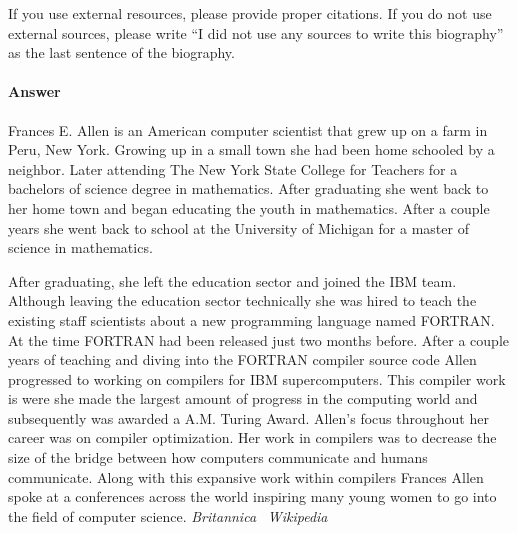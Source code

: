 \documentclass{article}
\begin{document}
If you use external resources, please provide
proper citations. If you do not use external sources, please write ``I did not
use any sources to write this biography'' as the last sentence of the
biography.

\paragraph{Answer}
Frances E. Allen is an American computer scientist that grew up on a farm in Peru,
New York. Growing up in a small town she had been home schooled by a neighbor.
Later attending The New York State College for Teachers for a bachelors of science
degree in mathematics. After graduating she went back to her home town and began
educating the youth in mathematics. After a couple years she went back to school
at the University of Michigan for a master of science in mathematics.

After graduating, she left the education sector and joined the IBM team. Although
leaving the education sector technically she was hired to teach the existing
staff scientists about a new programming language named FORTRAN. At the time FORTRAN
had been released just two months before. After a couple years of teaching and
diving into the FORTRAN compiler source code Allen progressed to working on
compilers for IBM supercomputers. This compiler work is were she made the
largest amount of progress in the computing world and subsequently was awarded
a A.M. Turing Award. Allen's focus throughout her career was on compiler optimization.
Her work in compilers was to decrease the size of the bridge between how computers
communicate and humans communicate. Along with this expansive work within compilers
Frances Allen spoke at a conferences across the world inspiring many young women
to go into the field of computer science.
\emph{Britannica}~\cite{britannica}
\emph{Wikipedia}~\cite{wikipedia}
 \newpage
 
 
\end{document}
